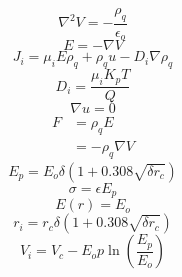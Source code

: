 \section*{}


$$\nabla^2 V = - \frac{\rho_q }{\epsilon_o}$$
$$E = - \nabla V $$
$$J_i = \mu_i E \rho_q + \rho_q u - D_i \nabla \rho_q$$
$$D_i = \frac{\mu_i K_p T}{Q}$$
$$\nabla u =0 $$
\begin{align*}
F&= \rho_q E \\
&= -\rho_q\nabla V\end{align*}
$$ E_p = E_o \delta (1+ 0.308\sqrt{\delta r_c}) $$
$$\sigma = \epsilon E_p$$
$$E(r) = E_o $$ %
$$ r_i = r_c \delta (1+ 0.308\sqrt{\delta r_c}) $$
$$V_i = V_c - E_o p \ln({\frac{E_p}{E_o}})$$ %
